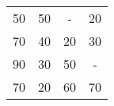 \begin{tabular}{cccc}
50     & 50     & -      & 20 \\
70     & 40     & 20     & 30 \\
90     & 30     & 50     & - \\
70     & 20     & 60     & 70 \bigstrut[b]\\
\hline
\hline
\end{tabular}%
